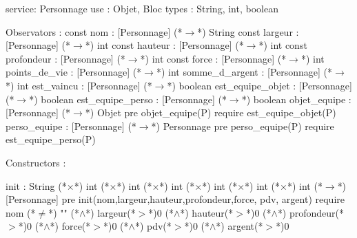 \documentclass[a4paper, 11pt]{report}
\begin{document}
\begin{Spe}
service: Personnage
use : Objet, Bloc
types : String, int, boolean

Observators : 
	const nom : [Personnage] (*$\rightarrow$*) String
	const largeur : [Personnage] (*$\rightarrow$*) int
	const hauteur : [Personnage] (*$\rightarrow$*) int
	const profondeur : [Personnage] (*$\rightarrow$*) int
	const force : [Personnage] (*$\rightarrow$*) int 
	points_de_vie : [Personnage] (*$\rightarrow$*) int
	somme_d_argent : [Personnage] (*$\rightarrow$*) int 
	est_vaincu : [Personnage] (*$\rightarrow$*) boolean 
	est_equipe_objet : [Personnage] (*$\rightarrow$*) boolean
        est_equipe_perso : [Personnage] (*$\rightarrow$*) boolean 
	objet_equipe : [Personnage] (*$\rightarrow$*) Objet
		pre objet_equipe(P) require est_equipe_objet(P)
        perso_equipe : [Personnage] (*$\rightarrow$*) Personnage
		pre perso_equipe(P) require est_equipe_perso(P) 

Constructors : 

	init : String (*$\times$*) int (*$\times$*) int (*$\times$*) int (*$\times$*) int (*$\times$*) int (*$\times$*) int (*$\rightarrow$*) [Personnage]
		pre init(nom,largeur,hauteur,profondeur,force, pdv, argent) require nom (*$\neq$*) "" (*$\land$*) largeur(*$>$*)0 (*$\land$*) hauteur(*$>$*)0 (*$\land$*) profondeur(*$>$*)0 (*$\land$*) force(*$>$*)0 (*$\land$*) pdv(*$>$*)0 (*$\land$*) argent(*$>$*)0 


\end{Spe}
\end{document}
